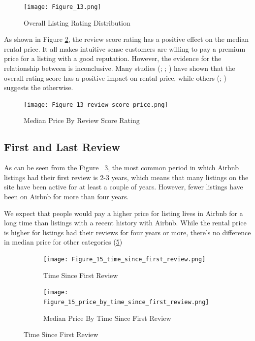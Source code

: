 \begin{figure}[H]\centering
    \texttt{[image: Figure\_13.png]}
    \caption{Overall Listing Rating Distribution}
    \label{fig:overall-listing}
\end{figure}

As shown in Figure \ref{fig:price_by_review_score_rating}, the review score
rating has a positive effect on the median rental price. It all makes intuitive
sense customers are willing to pay a premium price for a listing with a good
reputation.  However, the evidence for the relationship between is inconclusive.
Many studies (\cite{chen2017consumer}; \cite{gibbs2018use};
\cite{wang2017price}) have shown that the overall rating score has a positive
impact on rental price, while others (\cite{li2016pros}; \cite{zhang2017key})
suggests the otherwise.

\begin{figure}[H]\centering
    \texttt{[image: Figure\_13\_review\_score\_price.png]}
    \caption{Median Price By Review Score Rating}
    \label{fig:price_by_review_score_rating}
\end{figure}

\subsection{First and Last Review}

As can be seen from the Figure ~\ref{fig:time_since_first_review}, the most
common period in which  Airbnb listings had their first review is 2-3 years,
which means that many listings on the site have been active for at least a
couple of years. However,  fewer listings have been on Airbnb for more than four
years.

We expect that people would pay a higher price for listing lives in Airbnb for a
long time than listings with a recent history with Airbnb.
While the rental price is higher for listings had their reviews for four years
or more, there's no difference in median price for other categories
(\ref{fig:time_since_first_review_price})

\begin{figure}[H]
    \centering
    \begin{subfigure}[b]{0.48\textwidth}
        \centering
        \texttt{[image: Figure\_15\_time\_since\_first\_review.png]}
        \caption{Time Since First Review}
        \label{fig:time_since_first_review}
    \end{subfigure}
    \begin{subfigure}[b]{0.48\textwidth}
        \centering
        \texttt{[image: Figure\_15\_price\_by\_time\_since\_first\_review.png]}
        \caption{Median Price By Time Since First Review}
        \label{fig:time_since_first_review_price}
    \end{subfigure}
    \caption{Time Since First Review}
\end{figure}

